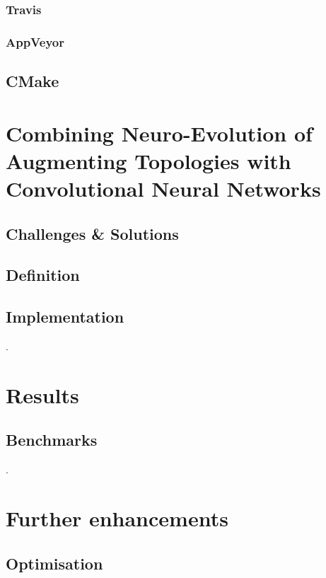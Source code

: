 \documentclass[11pt]{article}
\begin{document}
			\subsubsection{Travis}
				
			\subsubsection{AppVeyor}
				
		\subsection{CMake}
			
	\newpage

	\section{Combining Neuro-Evolution of Augmenting Topologies with Convolutional Neural Networks}
		\subsection{Challenges \& Solutions}
			
		\subsection{Definition}
			
		\subsection{Implementation}
			.
	\newpage

	\section{Results}
		\subsection{Benchmarks}
			.
	\newpage

	\section{Further enhancements}
		\subsection{Optimisation}
			
\end{document}
